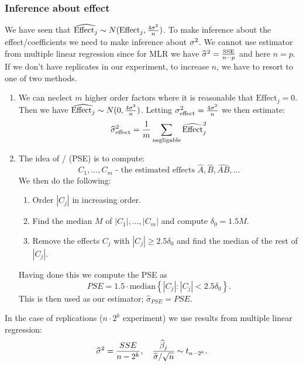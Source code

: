 \subsubsection{Inference about effect}

We have seen that $\widehat{\textrm{Effect}_j} \sim N(\textrm{Effect}_j, \frac{4\sigma^2}{n})$. To make inference about the effect/coefficients we need to make inference about $\sigma^2$. We cannot use estimator from multiple linear regression since for MLR we have $\widehat{\sigma}^2=\frac{\textrm{SSE}}{n-p}$ and here $n=p$. If we don't have replicates in our experiment, to increase $n$, we have to resort to one of two methods.
\begin{enumerate}
    \item We can neclect $m$ higher order factors where it is reasonable that $\textrm{Effect}_j = 0$. Then we have $\widehat{\textrm{Effect}_j} \sim N(0, \frac{4\sigma^2}{n})$. Letting $\sigma^2_{\textrm{effect}} = \frac{4\sigma^2}{n}$ we then estimate:
    $$
        \widehat{\sigma}^2_{\textrm{effect}} = \frac{1}{m} \sum_{\textrm{negligable}} \widehat{\textrm{Effect}}_j^2
    $$

    \item The idea of  /  (PSE) is to compute:
    $$
        C_1, \ldots, C_m \text{ - the estimated effects } \hat{A}, \hat{B}, \hat{AB}, \ldots
    $$  
    We then do the following:
        \begin{enumerate}
            \item Order $|C_j|$ in increasing order.
            \item Find the median $M$ of $|C_1|, \ldots, |C_{m}|$ and compute $\delta_0 = 1.5M$.
            \item Remove the effects $C_j$ with $|C_j| \geq 2.5 \delta_0$ and find the median of the rest of $|C_j|$.
        \end{enumerate}
    Having done this we compute the PSE as 
    $$
        PSE = 1.5 \cdot \text{median} \left\{ |C_j| : |C_j| < 2.5 \delta_0 \right\}.
    $$
    This is then used as our estimator; $\hat{\sigma}_{PSE} = PSE$.
        
\end{enumerate}

In the case of replications ($n\cdot 2^k$ experiment) we use results from multiple linear regression:
$$
    \widehat{\sigma}^2 = \frac{SSE}{n-2^k}, \quad \frac{\widehat{\beta}_j}{\widehat{\sigma} / \sqrt{n}} \sim t_{n-2^k}.
$$


